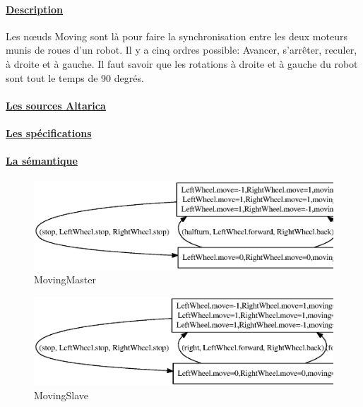     \paragraph{\underline{Description\\}}
    Les n\oe{}uds Moving sont là pour faire la synchronisation entre les deux moteurs
    munis de roues d'un robot. Il y a cinq ordres possible: Avancer,
    s'arrêter, reculer, à droite et à gauche. Il faut savoir que les
    rotations à droite et à gauche du robot sont tout le temps de 90
    degrés.

    \paragraph{\underline{Les sources Altarica\\}}
    
    
    
    \paragraph{\underline{Les spécifications\\}}
    
    
    
    \paragraph{\underline{La sémantique\\}}
    \begin{figure}[!ht]
     \begin{center}
      \includegraphics[width=16cm]{../src/altarica/MovingMaster.eps}
      \caption{MovingMaster}
     \end{center}
    \end{figure}

    \begin{figure}[!ht]
     \begin{center}
      \includegraphics[width=16cm]{../src/altarica/MovingSlave.eps}
      \caption{MovingSlave}
     \end{center}
    \end{figure}


